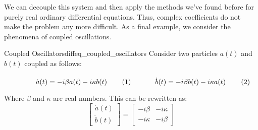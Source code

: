             We can decouple this system and
            then apply the methods we've
            found before for purely real
            ordinary differential equations.
            Thus, complex coefficients do not
            make the problem any more
            difficult. As a final example,
            we consider the phenomena of
            coupled oscillations.
            \newpage
            \begin{fexample}
            {Coupled Oscillators}{diffeq_coupled_oscillators}
                Consider two particles $a(t)$ and $b(t)$
                coupled as follows:
                \par
                \vspace{-1.5ex}
                \begin{subequations}
                    \begin{minipage}{0.49\textwidth}
                        \begin{equation}
                            \label{diffeq:coupled_osc_eq_1}
                            \dot{a}(t)=-i\beta{a}(t)-i\kappa{b}(t)
                        \end{equation}
                    \end{minipage}
                    \hfill
                    \begin{minipage}{0.49\textwidth}
                        \begin{equation}
                            \label{diffeq:coupled_osc_eq_2}
                            \dot{b}(t)=-i\beta{b}(t)-i\kappa{a}(t)
                        \end{equation}
                    \end{minipage}
                \end{subequations}
                \par\hfill\par
                Where $\beta$ and $\kappa$ are
                real numbers. This can be rewritten as:
                \begin{equation}
                    \begin{bmatrix}
                        \dot{a}(t)\\
                        \dot{b}(t)
                    \end{bmatrix}
                    =
                    \begin{bmatrix}
                        -i\beta&-i\kappa\\
                        -i\kappa&-i\beta

\end{bmatrix}
\end{equation}
\end{fexample}
